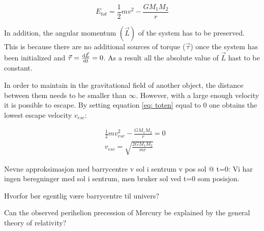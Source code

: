 \begin{equation}
	E_{tot} = \frac{1}{2}mv^2 - \frac{G	M_1M_2}{r} \label{eq: toten}
\end{equation}

 In addition, the angular momentum $ (\vec{L}) $ of the system has to be preserved. This is because there are no additional sources of torque ($ \vec{\tau} $) once the system has been initialized and $ \vec{\tau} = \dv{{\vec{L}}}{t} =0$. As a result all the absolute value of $ \vec{L} $ hast to be constant. 

In order to maintain in the gravitational field of another object, the distance between them needs to be smaller than $ \infty $. However, with a large enough velocity it is possible to escape. By setting  equation \ref{eq: toten} equal to $ 0 $ one obtains the lowest escape velocity $ v_{esc} $: 


\begin{align}
&\frac{1}{2}mv_{esc}^2 - \frac{G	M_1M_2}{r}  = 0\\
& v_{esc} = \sqrt{ \frac{2G	M_1M_2}{mr}}
\end{align}








Nevne approksimasjon med barrycentre v sol i sentrum v pos sol @ t=0:
Vi har ingen beregninger med sol i sentrum, men bruker sol ved t=0 som posisjon. 

Hvorfor bør egentlig være barrycentre til univers?


Can the observed perihelion precession of Mercury be explained by the general theory of relativity?



